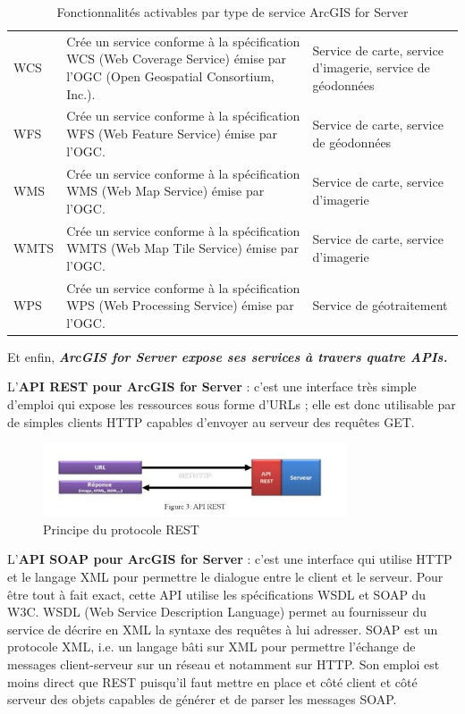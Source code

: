 \documentclass[11pt]{article}
\begin{document}
\begin{table}[H]
\begin{center}
\begin{tabular}{|m{3 cm}|p{7 cm}|p{3 cm}|}
			WCS & Crée un service conforme à la spécification WCS (Web Coverage Service) émise par l'OGC (Open Geospatial Consortium, Inc.). & Service de carte, service d'imagerie, service de géodonnées \\
			WFS & Crée un service conforme à la spécification WFS (Web Feature Service) émise par l'OGC. & Service de carte, service de géodonnées \\
			WMS & Crée un service conforme à la spécification WMS (Web Map Service) émise par l'OGC. & Service de carte, service d'imagerie \\
			WMTS & Crée un service conforme à la spécification WMTS (Web Map Tile Service) émise par l'OGC. & Service de carte, service d'imagerie \\
			WPS & Crée un service conforme à la spécification WPS (Web Processing Service) émise par l'OGC. &Service de géotraitement  \\
			\hline
		\end{tabular}
	\end{center}
	\caption{Fonctionnalités activables par type de service ArcGIS for Server} 
\end{table}
\newpage

Et enfin, \textbf{\emph{ArcGIS for Server expose ses services à travers quatre APIs.}}

L’\textbf{API REST pour ArcGIS for Server} : c’est une interface très simple d’emploi qui expose les ressources sous forme d’URLs ; elle est donc utilisable par de simples clients HTTP capables d’envoyer au serveur des requêtes GET.

\begin{figure}[H]
	\center \includegraphics[width=0.80\textwidth]{img/cours/api_rest.jpg}
	\caption{Principe du protocole REST}
\end{figure}

L’\textbf{API SOAP pour ArcGIS for Server} : c’est une interface qui utilise HTTP et le langage XML pour permettre le dialogue entre le client et le serveur. Pour être tout à fait exact, cette API utilise les spécifications WSDL et SOAP du W3C. WSDL (Web Service Description Language) permet au fournisseur du service de décrire en XML la syntaxe des requêtes à lui adresser. SOAP est un protocole XML, i.e. un langage bâti sur XML pour permettre l’échange de messages client-serveur sur un réseau et notamment sur HTTP. Son emploi est moins direct que REST puisqu’il faut mettre en place et côté client et côté serveur des objets capables de générer et de parser les messages SOAP.
\end{document}

